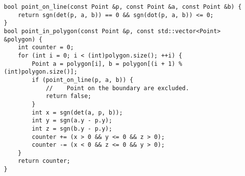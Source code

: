 \begin{lstlisting}
bool point_on_line(const Point &p, const Point &a, const Point &b) {
    return sgn(det(p, a, b)) == 0 && sgn(dot(p, a, b)) <= 0;
}
bool point_in_polygon(const Point &p, const std::vector<Point> &polygon) {
    int counter = 0;
    for (int i = 0; i < (int)polygon.size(); ++i) {
        Point a = polygon[i], b = polygon[(i + 1) % (int)polygon.size()];
        if (point_on_line(p, a, b)) {
            //    Point on the boundary are excluded.
            return false;
        }
        int x = sgn(det(a, p, b));
        int y = sgn(a.y - p.y);
        int z = sgn(b.y - p.y);
        counter += (x > 0 && y <= 0 && z > 0);
        counter -= (x < 0 && z <= 0 && y > 0);
    }
    return counter;
}
\end{lstlisting}
